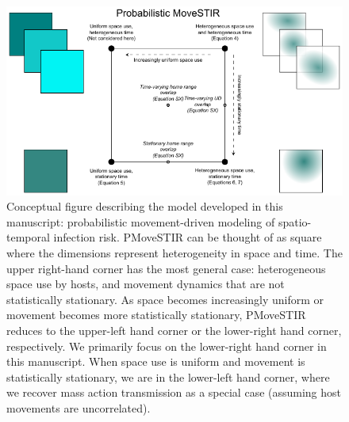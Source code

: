 \documentclass[letterpaper]{article}
\begin{document}


\clearpage


\begin{figure}
    \includegraphics[width=\textwidth]{figures/conceptual_figure_pmovestir_mod.pdf}
    \caption{Conceptual figure describing the model developed in this manuscript: probabilistic movement-driven modeling of spatio-temporal infection risk. PMoveSTIR can be thought of as square where the dimensions represent heterogeneity in space and time. The upper right-hand corner has the most general case: heterogeneous space use by hosts, and movement dynamics that are not statistically stationary.  As space becomes increasingly uniform or movement becomes more statistically stationary, PMoveSTIR reduces to the upper-left hand corner or the lower-right hand corner, respectively.  We primarily focus on the lower-right hand corner in this manuscript.  When space use is uniform and movement is statistically stationary, we are in the lower-left hand corner, where we recover mass action transmission as a special case (assuming host movements are uncorrelated).}
	\label{fig:square}
\end{figure}
\end{document}
